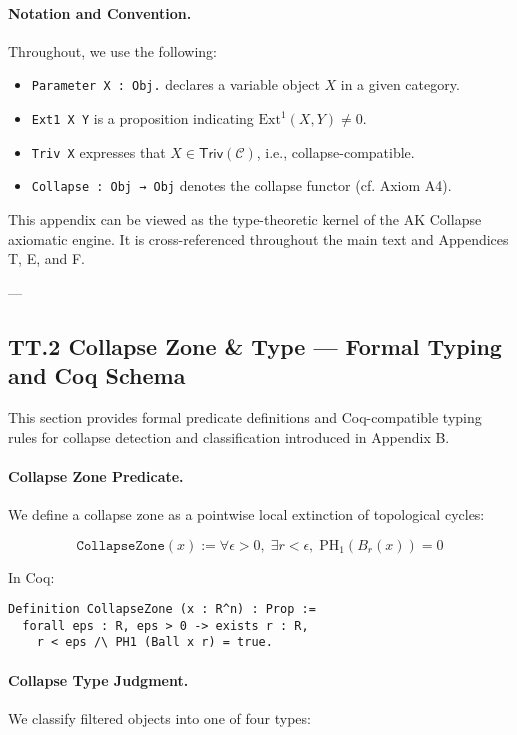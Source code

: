 \documentclass[11pt]{article}
\begin{document}
\paragraph{Notation and Convention.}  
Throughout, we use the following:
\begin{itemize}
  \item \texttt{Parameter X : Obj.} declares a variable object \( X \) in a given category.
  \item \texttt{Ext1 X Y} is a proposition indicating \( \mathrm{Ext}^1(X,Y) \neq 0 \).
  \item \texttt{Triv X} expresses that \( X \in \mathsf{Triv}(\mathcal{C}) \), i.e., collapse-compatible.
  \item \texttt{Collapse : Obj → Obj} denotes the collapse functor (cf. Axiom A4).
\end{itemize}

This appendix can be viewed as the type-theoretic kernel of the AK Collapse axiomatic engine.  
It is cross-referenced throughout the main text and Appendices T, E, and F.

---

\subsection*{TT.2 Collapse Zone \& Type — Formal Typing and Coq Schema}

This section provides formal predicate definitions and Coq-compatible typing rules  
for collapse detection and classification introduced in Appendix B.

\paragraph{Collapse Zone Predicate.}
We define a collapse zone as a pointwise local extinction of topological cycles:

\[
\texttt{CollapseZone}(x) := \forall \epsilon > 0,\; \exists r < \epsilon,\; \mathrm{PH}_1(B_r(x)) = 0
\]

In Coq:
\begin{lstlisting}[language=Coq]
Definition CollapseZone (x : R^n) : Prop :=
  forall eps : R, eps > 0 -> exists r : R,
    r < eps /\ PH1 (Ball x r) = true.
\end{lstlisting}

\paragraph{Collapse Type Judgment.}
We classify filtered objects into one of four types:
\end{document}
